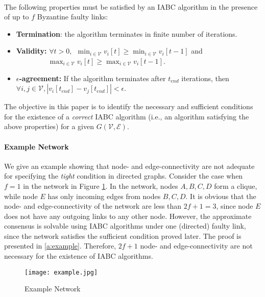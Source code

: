 \documentclass{llncs}
\newcommand{\scripte}{\mathcal{E}}
\newcommand{\scriptv}{\mathcal{V}}
\begin{document}
~

The following properties must be satisfied by an IABC algorithm
in the presence of up to $f$ Byzantine faulty links:
\begin{itemize}
\item {\bf Termination}: the algorithm terminates in finite number of iterations.\\

\item {\bf Validity:} $\forall t>0,
~~\min_{i \in \scriptv} v_i[t] \ge \min_{i \in \scriptv} v_i[t-1]$
 and \\
$~~~~~~~~~~~~~~~~~~~~\max_{i \in \scriptv} v_i[t] \ge \max_{i \in \scriptv} v_i[t-1]$.\\

\item {\bf $\epsilon$-agreement:} If the algorithm terminates after $t_{end}$ iterations, then $\forall i, j \in \scriptv, |v_i[t_{end}] - v_j[t_{end}]| < \epsilon$.
\end{itemize}
The objective in this paper is to identify the necessary and sufficient
conditions for the existence of a {\em correct} IABC algorithm (i.e.,
an algorithm satisfying the above properties) for a given $G(\scriptv,\scripte)$.




\paragraph{Example Network}

We give an example showing that node- and edge-connectivity are not adequate for specifying the {\em tight} condition in directed graphs. Consider the case when $f=1$ in the network in Figure \ref{f:eg}. In the network, nodes $A, B, C, D$ form a clique, while node $E$ has only incoming edges from nodes $B, C, D$. It is obvious that the node- and edge-connectivity of the network are less than $2f+1 = 3$, since node $E$ does not have any outgoing links to any other node. However, the approximate consensus is solvable using IABC algorithms under one (directed) faulty link, since the network satisfies the sufficient condition proved later. The proof is presented in \ref{a:example}. Therefore, $2f+1$ node- and edge-connectivity are not necessary for the existence of IABC algorithms.

\begin{figure}[hbt!]
\centering
\texttt{[image: example.jpg]}
\vspace*{-10pt}
\caption{Example Network}
\label{f:eg}
\end{figure}
\end{document}
